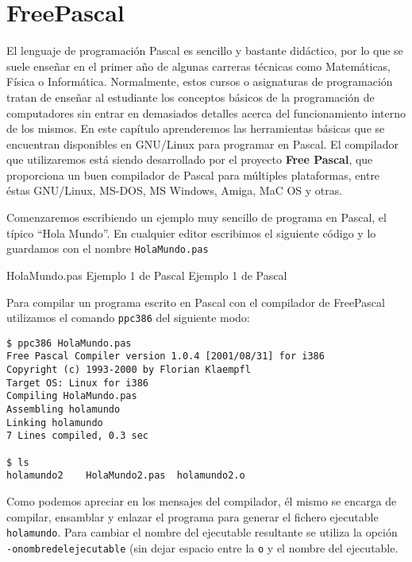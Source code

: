 
\chapter{FreePascal}
\label{freepascal.tex}

El lenguaje de  programación Pascal es sencillo  y bastante didáctico,
por  lo que  se suele  enseñar en  el primer  año de  algunas carreras
técnicas como  Matemáticas, Física  o Informática.  Normalmente, estos
cursos o asignaturas  de programación tratan de  enseñar al estudiante
los conceptos  básicos de la  programación de computadores  sin entrar
en  demasiados  detalles  acerca  del funcionamiento  interno  de  los
mismos. En este capítulo aprenderemos  las herramientas básicas que se
encuentran  disponibles  en GNU/Linux  para  programar  en Pascal.  El
compilador que  utilizaremos está siendo desarrollado  por el proyecto
{\bf Free Pascal},  que proporciona un buen compilador  de Pascal para
múltiples  plataformas, entre  éstas  GNU/Linux,  MS-DOS, MS  Windows,
Amiga, MaC OS y otras.

Comenzaremos  escribiendo  un  ejemplo  muy sencillo  de  programa  en
Pascal, el  típico ``Hola Mundo''.  En cualquier editor  escribimos el
siguiente código y lo guardamos con el nombre {\tt HolaMundo.pas}

\begin{ejemplo}{HolaMundo.pas}%
{Ejemplo 1 de Pascal }
Ejemplo 1 de Pascal 
\end{ejemplo}

Para  compilar un  programa escrito  en  Pascal con  el compilador  de
FreePascal utilizamos el comando {\tt ppc386} del siguiente modo:

\begin{verbatim}
$ ppc386 HolaMundo.pas
Free Pascal Compiler version 1.0.4 [2001/08/31] for i386
Copyright (c) 1993-2000 by Florian Klaempfl
Target OS: Linux for i386
Compiling HolaMundo.pas
Assembling holamundo
Linking holamundo
7 Lines compiled, 0.3 sec

$ ls
holamundo2    HolaMundo2.pas  holamundo2.o
\end{verbatim}

Como  podemos apreciar  en los  mensajes del  compilador, él  mismo se
encarga de compilar,  ensamblar y enlazar el programa  para generar el
fichero  ejecutable  {\tt  holamundo}.  Para  cambiar  el  nombre  del
ejecutable resultante se utiliza la opción {\tt -onombredelejecutable}
(sin dejar espacio entre la {\tt o} y el nombre del ejecutable.

